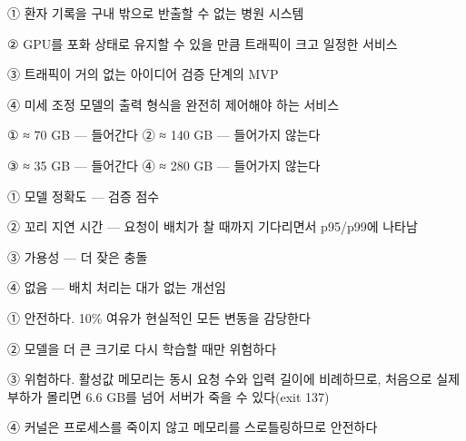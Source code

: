 \begin{tbboptions}
  \item ① 환자 기록을 구내 밖으로 반출할 수 없는 병원 시스템
  \item ② GPU를 포화 상태로 유지할 수 있을 만큼 트래픽이 크고 일정한 서비스
  \item ③ 트래픽이 거의 없는 아이디어 검증 단계의 MVP
  \item ④ 미세 조정 모델의 출력 형식을 완전히 제어해야 하는 서비스
\end{tbboptions}


\begin{tbboptions}
  \item ① ≈ 70 GB — 들어간다        ② ≈ 140 GB — 들어가지 않는다
  \item ③ ≈ 35 GB — 들어간다        ④ ≈ 280 GB — 들어가지 않는다
\end{tbboptions}


\begin{tbboptions}
  \item ① 모델 정확도 — 검증 점수
  \item ② 꼬리 지연 시간 — 요청이 배치가 찰 때까지 기다리면서 p95/p99에 나타남
  \item ③ 가용성 — 더 잦은 충돌
  \item ④ 없음 — 배치 처리는 대가 없는 개선임
\end{tbboptions}


\begin{tbboptions}
  \item ① 안전하다. 10\% 여유가 현실적인 모든 변동을 감당한다
  \item ② 모델을 더 큰 크기로 다시 학습할 때만 위험하다
  \item ③ 위험하다. 활성값 메모리는 동시 요청 수와 입력 길이에 비례하므로, 처음으로 실제 부하가 몰리면 6.6 GB를 넘어 서버가 죽을 수 있다(exit 137)
  \item ④ 커널은 프로세스를 죽이지 않고 메모리를 스로틀링하므로 안전하다
\end{tbboptions}

